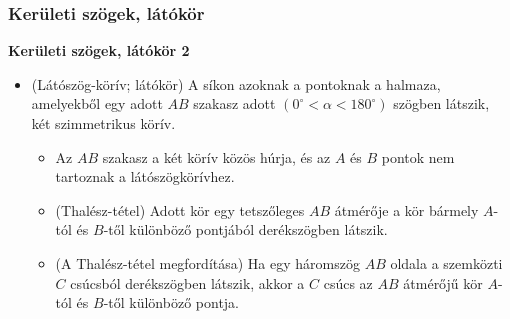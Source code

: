 \documentclass[11pt]{beamer}
\begin{document}
\begin{frame}[<+->]
\frametitle{Kerületi szögek, látókör}
\begin{block}{\textbf{Kerületi szögek, látókör 2}}
\begin{itemize}[label=$\circ$]
\item (Látószög-körív; látókör) A síkon azoknak a pontoknak a halmaza, amelyekből egy adott $AB$ szakasz adott $(0^\circ < \alpha < 180^\circ)$ szögben látszik, két szimmetrikus körív.
\begin{itemize}[label=$\circ$]
\item Az $AB$ szakasz  a két körív közös húrja, és az $A$ és $B$ pontok nem tartoznak a látószögkörívhez.
\item (Thalész-tétel) Adott kör egy tetszőleges $AB$ átmérője a kör bármely $A$-tól és $B$-től különböző pontjából derékszögben látszik.
\item (A Thalész-tétel megfordítása) Ha egy háromszög $AB$ oldala a szemközti $C$ csúcsból derékszögben látszik, akkor a $C$ csúcs az $AB$ átmérőjű kör $A$-tól és $B$-től különböző pontja.
\end{itemize}
\end{itemize}
\end{block}
\end{frame}
\end{document}
